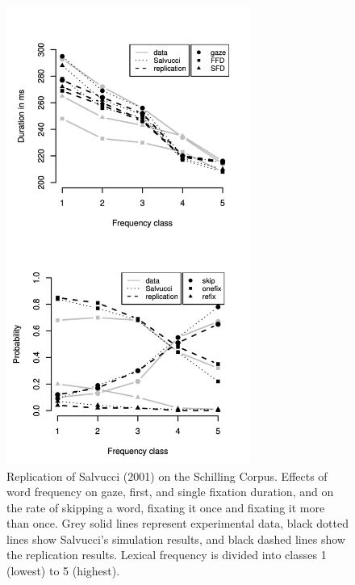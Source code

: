 \documentclass{cambridge7A}\usepackage[]{graphicx}\usepackage[]{color}
\begin{document}
\begin{figure}[!htbp]
\begin{center}
\includegraphics[height=15cm]{figures/figure51}
\end{center}
\caption{Replication of Salvucci (2001) on the Schilling Corpus. Effects of word frequency on gaze, first, and single fixation duration, and on the rate of skipping a word, fixating it once and fixating it more than once.  Grey solid lines represent experimental data, black dotted lines show Salvucci's simulation results, and black dashed lines show the replication results.  Lexical frequency is divided into classes 1 (lowest) to 5 (highest).}
\label{fig:src-fstat}
\end{figure}
\end{document}
